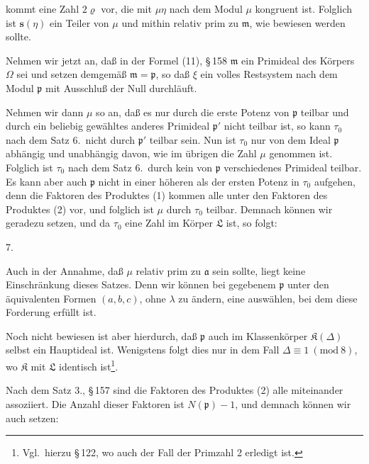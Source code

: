 kommt eine Zahl $2\varrho$ vor, die mit $\mu\eta$ nach dem Modul $\mu$ kongruent
 ist. Folglich ist $\boldsymbol{s}(\eta)$ ein Teiler von $\mu$ und mithin relativ
prim zu $\mathfrak{m}$, wie bewiesen werden sollte.

Nehmen wir jetzt an, da\ss{} in der Formel (11), \S\,158
$\mathfrak{m}$ ein Primideal des K\"orpers $\Omega$ sei und setzen demgem\"a\ss{}
$\mathfrak{m} = \mathfrak{p}$, so da\ss{} $\xi$ ein volles Restsystem nach dem Modul $\mathfrak{p}$ mit
Ausschlu\ss{} der Null durchl\"auft.

Nehmen wir dann $\mu$ so an, da\ss{} es nur durch die erste Potenz
von $\mathfrak{p}$ teilbar und durch ein beliebig gew\"ahltes anderes Primideal
$\mathfrak{p}'$ nicht teilbar ist, so kann $\tau_0$ nach dem Satz 6.\ nicht durch $\mathfrak{p}'$
teilbar sein. Nun ist $\tau_0$ nur von dem Ideal $\mathfrak{p}$ abh\"angig und
unabh\"angig davon, wie im \"ubrigen die Zahl $\mu$ genommen ist.
Folglich ist $\tau_0$ nach dem Satz 6.\ durch kein von $\mathfrak{p}$ verschiedenes
Primideal teilbar. Es kann aber auch $\mathfrak{p}$ nicht in einer h\"oheren
als der ersten Potenz in $\tau_0$ aufgehen, denn die Faktoren des
Produktes (1) kommen alle unter den Faktoren des Produktes (2)
vor, und folglich ist $\mu$ durch $\tau_0$ teilbar. Demnach k\"onnen wir
geradezu
setzen, und da $\tau_0$ eine Zahl im K\"orper $\mathfrak{L}$ ist, so folgt:

7. 

Auch in der Annahme, da\ss{} $\mu$ relativ prim zu $\mathfrak{a}$ sein sollte,
liegt keine Einschr\"ankung dieses Satzes. Denn wir k\"onnen bei
gegebenem $\mathfrak{p}$ unter den \"aquivalenten Formen $(a, b, c)$, ohne $\lambda$ zu
\"andern, eine ausw\"ahlen, bei dem diese Forderung erf\"ullt ist.

Noch nicht bewiesen ist aber hierdurch, da\ss{} $\mathfrak{p}$ auch im
Klassenk\"orper $\mathfrak{K}(\Delta)$ selbst ein Hauptideal ist. Wenigstens folgt
dies nur in dem Fall $\Delta \equiv 1\ (\mathrm{mod}\ 8)$, wo $\mathfrak{K}$ mit $\mathfrak{L}$ identisch
ist\footnote{Vgl.\ hierzu \S\,122, wo auch der Fall der Primzahl 2 erledigt ist.}.

Nach dem Satz 3., \S\,157 sind die Faktoren des Produktes (2)
alle miteinander assoziiert. Die Anzahl dieser Faktoren ist
$N(\mathfrak{p}) - 1$, und demnach k\"onnen wir auch setzen:
